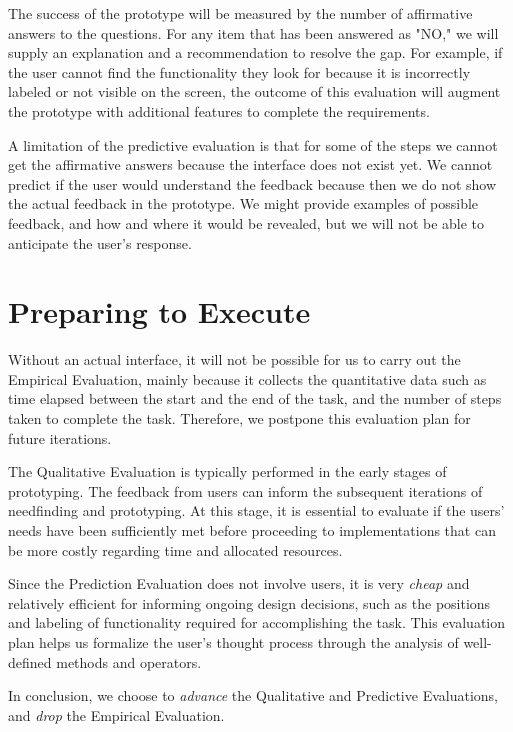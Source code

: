 \documentclass[12pt,letterpaper]{article}
\begin{document}
The success of the prototype will be measured by the number of affirmative answers to the questions. For any item that has been answered as "NO," we will supply an explanation and a recommendation to resolve the gap. For example, if the user cannot find the functionality they look for because it is incorrectly labeled or not visible on the screen, the outcome of this evaluation will augment the prototype with additional features to complete the requirements. 

A limitation of the predictive evaluation is that for some of the steps we cannot get the affirmative answers because the interface does not exist yet. We cannot predict if the user would understand the feedback because then we do not show the actual feedback in the prototype. We might provide examples of possible feedback, and how and where it would be revealed, but we will not be able to anticipate the user's response. 

\section*{Preparing to Execute}

Without an actual interface, it will not be possible for us to carry out the Empirical Evaluation, mainly because it collects the quantitative data such as time elapsed between the start and the end of the task, and the number of steps taken to complete the task. Therefore, we postpone this evaluation plan for future iterations. 

The Qualitative Evaluation is typically performed in the early stages of prototyping. The feedback from users can inform the subsequent iterations of needfinding and prototyping. At this stage, it is essential to evaluate if the users' needs have been sufficiently met before proceeding to implementations that can be more costly regarding time and allocated resources. 

Since the Prediction Evaluation does not involve users, it is very \textit{cheap} and relatively efficient for informing ongoing design decisions, such as the positions and labeling of functionality required for accomplishing the task. This evaluation plan helps us formalize the user's thought process through the analysis of well-defined methods and operators. 

In conclusion, we choose to \textit{advance} the Qualitative and Predictive Evaluations, and \textit{drop} the Empirical Evaluation.  

 

\end{document}

